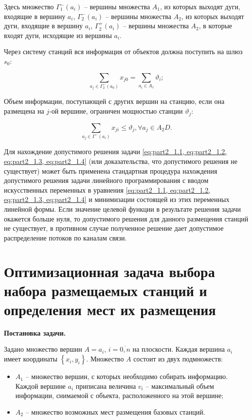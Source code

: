 Здесь множество $\Gamma_1^-(a_i)$ – вершины множества $A_1$, из которых выходят дуги, входящие в вершину $a_i$, $\Gamma_2^-(a_i)$ – вершины множества $A_2$, из которых выходят дуги, входящие в  вершину $a_i$, $\Gamma_2^+(a_i)$ – вершины множества $A_2$, в которые входят дуги, исходящие из вершины $a_i$.

Через систему станций вся информация от объектов  должна поступить  на шлюз $s_0$:

\begin{equation}\label{eq:part2_1.3}
    \sum_{a_j \in \Gamma_2^-(a_0)} x_{j0} =  \sum_{a_i \in A_1} \vartheta_i;
\end{equation}

Объем информации, поступающей с других вершин на станцию, если она размещена на $j$-ой вершине, ограничен мощностью станции $\vartheta_j$:

\begin{equation}\label{eq:part2_1.4}
    \sum_{a_j \in \Gamma^-(a_i)} x_{ji} \leqslant \vartheta_j, \forall a_j \in A_2D.
\end{equation}

Для нахождение допустимого решения задачи \cref{eq:part2_1.1, eq:part2_1.2, eq:part2_1.3, eq:part2_1.4} (или доказательства, что допустимого решения не существует) может быть применена стандартная процедура нахождения допустимого решения задачи линейного программирования с вводом искусственных переменных в уравнения \cref{eq:part2_1.1, eq:part2_1.2, eq:part2_1.3, eq:part2_1.4} и минимизации состоящей из этих переменных линейной формы. Если значение целевой функции в результате решения задачи окажется больше нуля, то допустимого решения для данного размещения станций не существует, в противном случае полученное решение дает допустимое распределение потоков по каналам связи.

\section{Оптимизационная задача выбора набора размещаемых станций и определения мест их размещения}
\textbf{Постановка задачи.}

Задано множество вершин $A = a_i$, $i=\overline{0,n}$ на плоскости. Каждая вершина $a_i$ имеет координаты $\left\{ x_i, y_i \right\}$.
Множество $A$ состоит из двух подмножеств: 
\begin{itemize}
    \item $A_1$ -- множество вершин, с которых необходимо собирать информацию. Каждой вершине $a_i$ приписана   величина $v_i$ -- максимальный объем информации, снимаемой с объекта, расположенного на этой вершине;
    \item $A_2$ -- множество возможных мест размещения базовых станций. 
\end{itemize}

